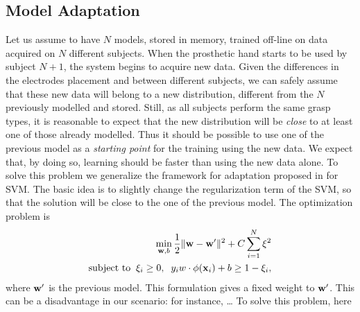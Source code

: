 \subsection{Model Adaptation}
\label{adapt}

Let us assume to have $N$ models, stored in memory, trained off-line on data acquired on $N$ different subjects. When the prosthetic hand starts to be used
by subject $N+1$, the system begins to acquire new data. Given the differences in the electrodes placement and between different subjects, we can safely
assume that these new data will belong to a new distribution, different from the $N$ previously modelled and stored. Still, as all subjects perform the same grasp types,
it is reasonable to expect that the new distribution will be \emph{close} to at least one of those already modelled. 
Thus
it should be possible to use one of the previous model as a
\emph{starting point} for the training using the new data.
We expect that, by doing so,  learning should be faster
than using the new data alone. 
To solve this problem we generalize the framework for adaptation proposed in
\cite{YangYH07} for SVM. 
The basic idea is to slightly change the regularization term
of the SVM, so that the solution will be close to the one of the previous model.
The optimization problem is \cite{YangYH07} %
\begin{align}
\min_{\mathbf{w},b} \frac{1}{2} \|\mathbf{w}- \mathbf{w}'\|^2 + C \sum_{i=1}^N \xi^2 \\
\mbox{subject to} \;\; \xi_i \geq 0,\;\; y_i w \cdot \phi(\mathbf{x}_i) + b \geq 1-\xi_i,
\label{eq:opt_prob_orig}
\end{align}
\noindent where $\mathbf{w}'$ is the previous model.
This formulation gives a fixed weight to $\mathbf{w}'$. This can be
a disadvantage in our scenario: for instance, \ldots
To solve this problem, here
